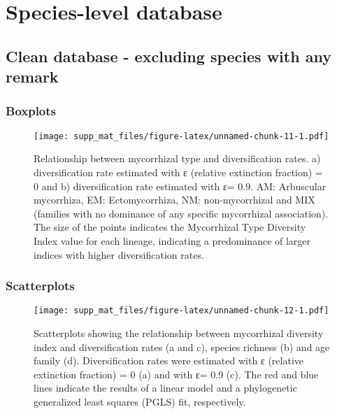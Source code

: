 \documentclass[]{article}
\begin{document}
\hypertarget{species-level-database}{%
\section{Species-level database}\label{species-level-database}}

\hypertarget{clean-database---excluding-species-with-any-remark}{%
\subsection{Clean database - excluding species with any
remark}\label{clean-database---excluding-species-with-any-remark}}

\hypertarget{boxplots-1}{%
\subsubsection{Boxplots}\label{boxplots-1}}

\begin{figure}
\centering
\texttt{[image: supp\_mat\_files/figure-latex/unnamed-chunk-11-1.pdf]}
\caption{Relationship between mycorrhizal type and diversification
rates. a) diversification rate estimated with ε (relative extinction
fraction) = 0 and b) diversification rate estimated with ε= 0.9. AM:
Arbuscular mycorrhiza, EM: Ectomycorrhiza, NM: non-mycorrhizal and MIX
(families with no dominance of any specific mycorrhizal association).
The size of the points indicates the Mycorrhizal Type Diversity Index
value for each lineage, indicating a predominance of larger indices with
higher diversification rates.}
\end{figure}

\hypertarget{scatterplots-1}{%
\subsubsection{Scatterplots}\label{scatterplots-1}}

\begin{figure}
\centering
\texttt{[image: supp\_mat\_files/figure-latex/unnamed-chunk-12-1.pdf]}
\caption{Scatterplots showing the relationship between mycorrhizal
diversity index and diversification rates (a and c), species richness
(b) and age family (d). Diversification rates were estimated with ε
(relative extinction fraction) = 0 (a) and with ε= 0.9 (c). The red and
blue lines indicate the results of a linear model and a phylogenetic
generalized least squares (PGLS) fit, respectively.}
\end{figure}
\end{document}
